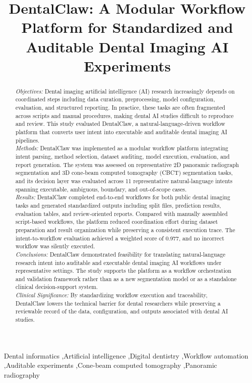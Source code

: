 \documentclass[final,5p,times,twocolumn]{elsarticle}
\begin{document}
\begin{frontmatter}

\title{DentalClaw: A Modular Workflow Platform for Standardized and Auditable Dental Imaging AI Experiments}

\begin{abstract}
\textit{Objectives:} Dental imaging artificial intelligence (AI) research increasingly depends on coordinated steps including data curation, preprocessing, model configuration, evaluation, and structured reporting. In practice, these tasks are often fragmented across scripts and manual procedures, making dental AI studies difficult to reproduce and review. This study evaluated DentalClaw, a natural-language-driven workflow platform that converts user intent into executable and auditable dental imaging AI pipelines.\\
\textit{Methods:} DentalClaw was implemented as a modular workflow platform integrating intent parsing, method selection, dataset auditing, model execution, evaluation, and report generation. The system was assessed on representative 2D panoramic radiograph segmentation and 3D cone-beam computed tomography (CBCT) segmentation tasks, and its decision layer was evaluated across 11 representative natural-language intents spanning executable, ambiguous, boundary, and out-of-scope cases.\\
\textit{Results:} DentalClaw completed end-to-end workflows for both public dental imaging tasks and generated standardized outputs including split files, prediction results, evaluation tables, and review-oriented reports. Compared with manually assembled script-based workflows, the platform reduced coordination effort during dataset preparation and result organization while preserving a consistent execution trace. The intent-to-workflow evaluation achieved a weighted score of 0.977, and no incorrect workflow was silently executed.\\
\textit{Conclusions:} DentalClaw demonstrated feasibility for translating natural-language research intent into auditable and executable dental imaging AI workflows under representative settings. The study supports the platform as a workflow orchestration and validation framework rather than as a new segmentation model or as a standalone clinical decision-support system.\\
\textit{Clinical Significance:} By standardizing workflow execution and traceability, DentalClaw lowers the technical barrier for dental researchers while preserving a reviewable record of the data, configuration, and outputs associated with dental AI studies.
\end{abstract}

\begin{keyword}
Dental informatics \sep Artificial intelligence \sep Digital dentistry \sep Workflow automation \sep Auditable experiments \sep Cone-beam computed tomography \sep Panoramic radiography
\end{keyword}

\end{frontmatter}
\end{document}
